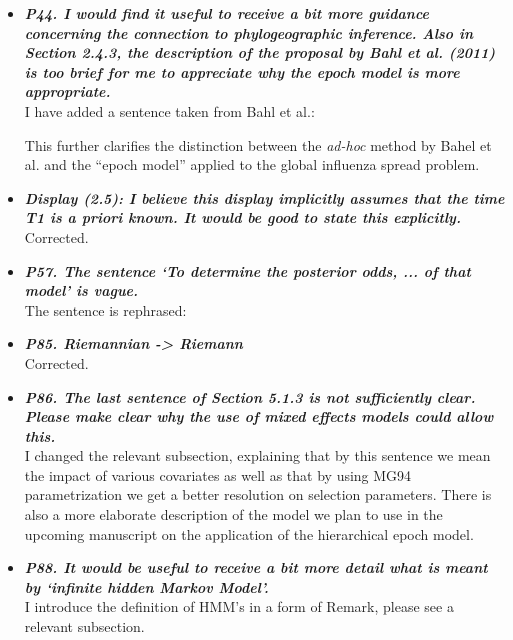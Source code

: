\documentclass[english]{article}
\begin{document}
\begin{itemize}
\item {
{\it
\textbf{
P44. I would find it useful to receive a bit more guidance concerning the connection to phylogeographic inference. 
Also in Section 2.4.3, the description of the proposal by Bahl et al. (2011) is too brief for me to appreciate why the epoch model is more appropriate.
}%
}%
}%
\\
I have added a sentence taken from Bahl et al.:

\begin{quote}
\myeditsvsixteen
\end{quote}

This further clarifies the distinction between the \emph{ad-hoc} method by Bahel et al. and the ``epoch model'' applied to the global influenza spread problem.

\item {
{\it
\textbf{
Display (2.5): I believe this display implicitly assumes that the time T1 is a priori known. 
It would be good to state this explicitly.
}%
}%
}%
\\
Corrected.


\item {
{\it
\textbf{
P57. The sentence `To determine the posterior odds, ... of that model' is vague.
}%
}%
}%
\\
The sentence is rephrased:

\begin{quote}
\myeditsveighteen
\end{quote}


\item {
{\it
\textbf{
P85. Riemannian -> Riemann
}%
}%
}%
\\
Corrected.


\item {
{\it
\textbf{
P86. The last sentence of Section 5.1.3 is not sufficiently clear. 
Please make clear why the use of mixed effects models could allow this.
}%
}%
}%
\\
I changed the relevant subsection, explaining that by this sentence we mean the impact of various covariates as well as that by using MG94 parametrization we get a better resolution on selection parameters.
There is also a more elaborate description of the model we plan to use in the upcoming manuscript on the application of the hierarchical epoch model.



\item {
{\it
\textbf{
P88. It would be useful to receive a bit more detail what is meant by `infinite hidden Markov Model'.
}%
}%
}%
\\
I introduce the definition of HMM's in a form of Remark, please see a relevant subsection. 



\end{itemize}
\end{document}
